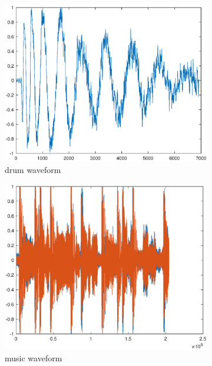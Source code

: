 \begin{figure}[h!]
	\centering
	\begin{subfigure}[t]{0.32\linewidth}
		\includegraphics[width=1\linewidth]{figures/part1/drum.eps}
		\caption{drum waveform}
		\label{fig:drum}
	\end{subfigure}
	\begin{subfigure}[t]{0.32\linewidth}
		\centering
		\includegraphics[width=1\linewidth]{figures/part1/music.eps}
		\caption{music waveform}
		\label{fig:music}
	\end{subfigure}
	\begin{subfigure}[t]{0.32\linewidth}

\end{subfigure}
\end{figure}
